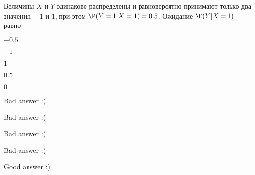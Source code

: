 
\begin{question}
Величины \(X\) и \(Y\) одинаково распределены и равновероятно принимают
только два значения, \(-1\) и \(1\), при этом \(\P(Y=1|X=1)=0.5\).
Ожидание \(\E(Y|X=1)\) равно
\begin{answerlist}
  \item \(-0.5\)
  \item \(-1\)
  \item \(1\)
  \item \(0.5\)
  \item \(0\)
\end{answerlist}
\end{question}

\begin{solution}
\begin{answerlist}
  \item Bad answer :(
  \item Bad answer :(
  \item Bad answer :(
  \item Bad answer :(
  \item Good answer :)
\end{answerlist}
\end{solution}

